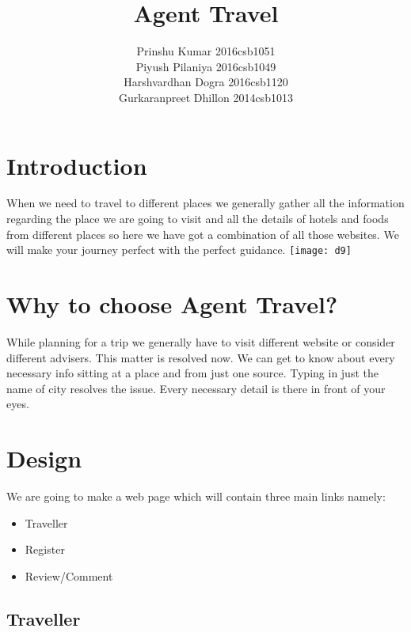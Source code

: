 \documentclass{article}
\title{Agent Travel}
\author{Prinshu Kumar 2016csb1051\\Piyush Pilaniya  2016csb1049\\Harshvardhan Dogra 2016csb1120 \\ Gurkaranpreet Dhillon 2014csb1013 }
\begin{document}
\maketitle

\section{Introduction}
When we need to travel to different places we generally
gather all the information regarding the place we are going
to visit and all the details of hotels and foods from different
places so here we have got a combination of all those websites.
We will make your journey perfect with the perfect guidance.
\texttt{[image: d9]}

\section{Why to choose Agent Travel?}
While planning for a trip we generally have to visit different
website or consider different advisers. This matter is resolved
now. We can get to know about every necessary info sitting at
a place and from just one source. Typing in just the name of
city resolves the issue. Every necessary detail is there in front
of your eyes.

\section{Design}
We are going to make a web page which will contain three main links namely:
\begin{itemize}
    \item Traveller
    \item Register
    \item Review/Comment
\end{itemize}

\subsection{Traveller}
\end{document}
